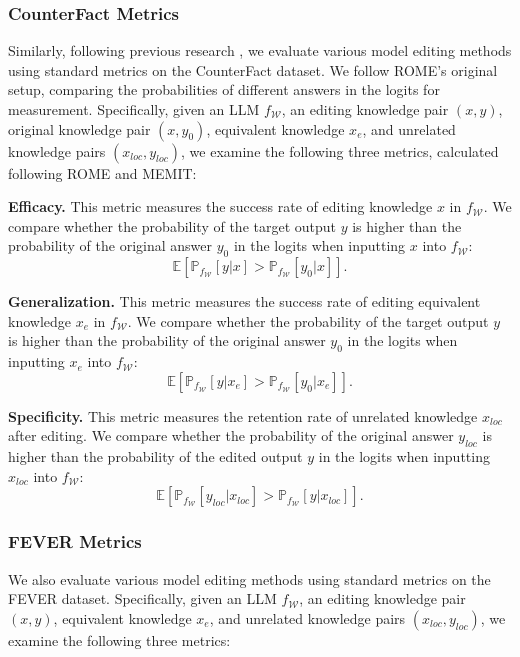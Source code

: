 \subsubsection{CounterFact Metrics}
Similarly, following previous research \cite{rome,memit}, we evaluate various model editing methods using standard metrics on the CounterFact dataset. We follow ROME's original setup, comparing the probabilities of different answers in the logits for measurement. Specifically, given an LLM $f_{\mathcal{W}}$, an editing knowledge pair $(x, y)$, original knowledge pair $(x, y_0)$, equivalent knowledge $x_e$, and unrelated knowledge pairs $(x_{loc}, y_{loc})$, we examine the following three metrics, calculated following ROME and MEMIT:

\textbf{Efficacy.} This metric measures the success rate of editing knowledge $x$ in $f_{\mathcal{W}}$. We compare whether the probability of the target output $y$ is higher than the probability of the original answer $y_0$ in the logits when inputting $x$ into $f_\mathcal{W}$:
\begin{equation}
\mathbb{E}\left[\mathbb{P}_{f_{\mathcal{W}}}\left[y\left|x\right.\right]>\mathbb{P}_{f_{\mathcal{W}}}\left[y_0\left|x\right.\right]\right].
\end{equation}

\textbf{Generalization.} This metric measures the success rate of editing equivalent knowledge $x_e$ in $f_{\mathcal{W}}$. We compare whether the probability of the target output $y$ is higher than the probability of the original answer $y_0$ in the logits when inputting $x_e$ into  $f_\mathcal{W}$:
\begin{equation}
\mathbb{E}\left[\mathbb{P}_{f_{\mathcal{W}}}\left[y\left|x_e\right.\right]>\mathbb{P}_{f_{\mathcal{W}}}\left[y_0\left|x_e\right.\right]\right].
\end{equation}

\textbf{Specificity.} This metric measures the retention rate of unrelated knowledge $x_{loc}$ after editing. We compare whether the probability of the original answer $y_{loc}$ is higher than the probability of the edited output $y$ in the logits when inputting $x_{loc}$ into  $f_\mathcal{W}$:
\begin{equation}
\mathbb{E}\left[\mathbb{P}_{f_{\mathcal{W}}}\left[y_{loc}\left|x_{loc}\right.\right]>\mathbb{P}_{f_{\mathcal{W}}}\left[y\left|x_{loc}\right.\right]\right].
\end{equation}

\subsubsection{FEVER Metrics}
We also evaluate various model editing methods using standard metrics on the FEVER dataset. Specifically, given an LLM $f_{\mathcal{W}}$, an editing knowledge pair $(x, y)$, equivalent knowledge $x_e$, and unrelated knowledge pairs $(x_{loc}, y_{loc})$, we examine the following three metrics:

